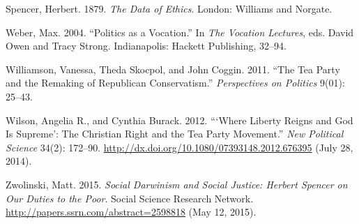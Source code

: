 \documentclass[12pt,]{article}
\begin{document}
Spencer, Herbert. 1879. \emph{The Data of Ethics}. London: Williams and
Norgate.

Weber, Max. 2004. ``Politics as a Vocation.'' In \emph{The Vocation
Lectures}, eds. David Owen and Tracy Strong. Indianapolis: Hackett
Publishing, 32--94.

Williamson, Vanessa, Theda Skocpol, and John Coggin. 2011. ``The Tea
Party and the Remaking of Republican Conservatism.'' \emph{Perspectives
on Politics} 9(01): 25--43.

Wilson, Angelia R., and Cynthia Burack. 2012. ```Where Liberty Reigns
and God Is Supreme': The Christian Right and the Tea Party Movement.''
\emph{New Political Science} 34(2): 172--90.
\url{http://dx.doi.org/10.1080/07393148.2012.676395} (July 28, 2014).

Zwolinski, Matt. 2015. \emph{Social Darwinism and Social Justice:
Herbert Spencer on Our Duties to the Poor}. Social Science Research
Network. \url{http://papers.ssrn.com/abstract=2598818} (May 12, 2015).
\end{document}

